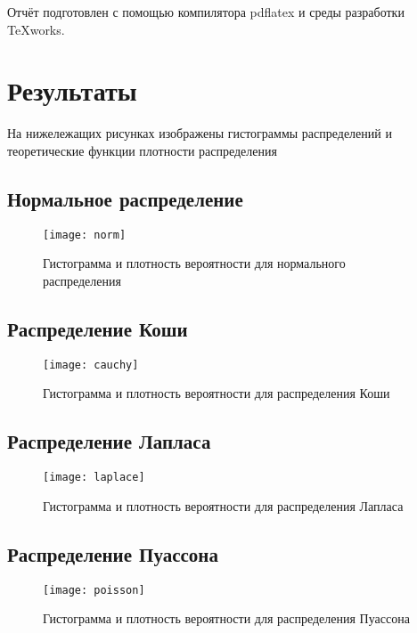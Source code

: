 Отчёт подготовлен с помощью компилятора pdflatex и среды разработки TeXworks.

\section{Результаты}
На нижележащих рисунках изображены гистограммы распределений и теоретические функции плотности распределения

\subsection{Нормальное распределение}
\begin{figure}[H]
	\begin{center}
		\texttt{[image: norm]}
		\caption{Гистограмма и плотность вероятности для нормального распределения} 
		\label{pic:pic_name}
	\end{center}
\end{figure}

\subsection{Распределение Коши}
\begin{figure}[H]
	\begin{center}
		\texttt{[image: cauchy]}
		\caption{Гистограмма и плотность вероятности для распределения Коши} 
		\label{pic:pic_name} 
	\end{center}
\end{figure}

\subsection{Распределение Лапласа}
\begin{figure}[H]
	\begin{center}
		\texttt{[image: laplace]}
		\caption{Гистограмма и плотность вероятности для распределения Лапласа} 
		\label{pic:pic_name} 
	\end{center}
\end{figure}

\subsection{Распределение Пуассона}
\begin{figure}[H]
	\begin{center}
		\texttt{[image: poisson]}
		\caption{Гистограмма и плотность вероятности для распределения Пуассона} 
		\label{pic:pic_name} 
	\end{center}
\end{figure}

